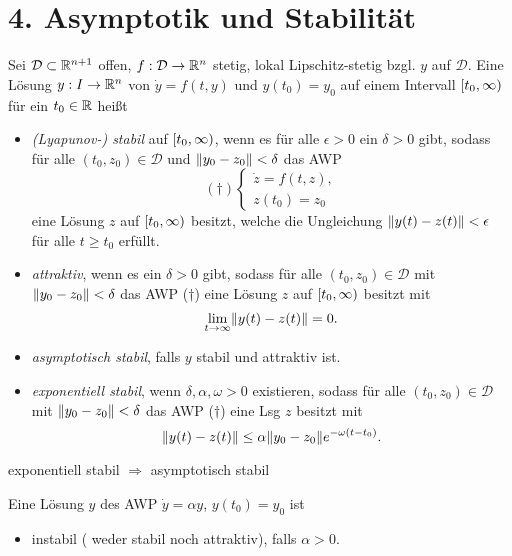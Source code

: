 \documentclass{cheat-sheet}
\newcommand{\D}{\mathcal{D}}
\begin{document}
\section{4. Asymptotik und Stabilität}




\begin{defn}
  Sei $\D \subset \R^{n+1}$ offen, $f : \D \to \R^n$ stetig, lokal Lipschitz-stetig bzgl. $y$ auf $\D$. Eine Lösung $y : I \to \mathbb{R}^n$ von $\dot{y} = f(t, y)$ und $y(t_0) = y_0$ auf einem Intervall $\left[ t_0, \infty \right)$ für ein $t_0 \in \mathbb{R}$ heißt
  \begin{itemize}
    \item \emph{(Lyapunov-) stabil} auf $\left[ t_0, \infty \right)$, wenn es für alle $\epsilon > 0$ ein $\delta > 0$ gibt, sodass für alle $(t_0, z_0) \in \D$ und $\lVert y_0 - z_0\rVert < \delta$ das AWP
    \[
      (\dagger) \left\{ \begin{array}{ll}
        \dot{z} = f(t, z),\\
        z(t_0) = z_0
      \end{array} \right.
    \]
    eine Lösung $z$ auf $\left[ t_0, \infty \right)$ besitzt, welche die Ungleichung $\lVert y(t) - z(t)\rVert < \epsilon$ für alle $t \geq t_0$ erfüllt.
    \item \emph{attraktiv}, wenn es ein $\delta > 0$ gibt, sodass für alle $(t_0, z_0) \in \D$ mit $\lVert y_0 - z_0\rVert < \delta$ das AWP ($\dagger$) eine Lösung $z$ auf $\left[ t_0, \infty \right)$ besitzt mit
    \[ \lim_{t \to \infty} \lVert y(t) - z(t)\rVert = 0. \]
    \item \emph{asymptotisch stabil}, falls $y$ stabil und attraktiv ist.
    \item \emph{exponentiell stabil}, wenn $\delta, \alpha, \omega > 0$ existieren, sodass für alle $(t_0, z_0) \in \D$ mit $\lVert y_0 - z_0\rVert < \delta$ das AWP ($\dagger$) eine Lsg $z$ besitzt mit
    \[ \lVert y(t) - z(t)\rVert \leq \alpha \lVert y_0 - z_0\rVert e^{-\omega (t-t_0)}. \]
  \end{itemize}
\end{defn}

\begin{bem}
  exponentiell stabil $\Rightarrow$ asymptotisch stabil
\end{bem}

\begin{bsp}
  Eine Lösung $y$ des AWP $\dot{y} = \alpha y$, $y(t_0) = y_0$ ist
  \begin{itemize}
    \item instabil (\dh{} weder stabil noch attraktiv), falls $\alpha > 0$.
  \end{itemize}
\end{bsp}
\end{document}
